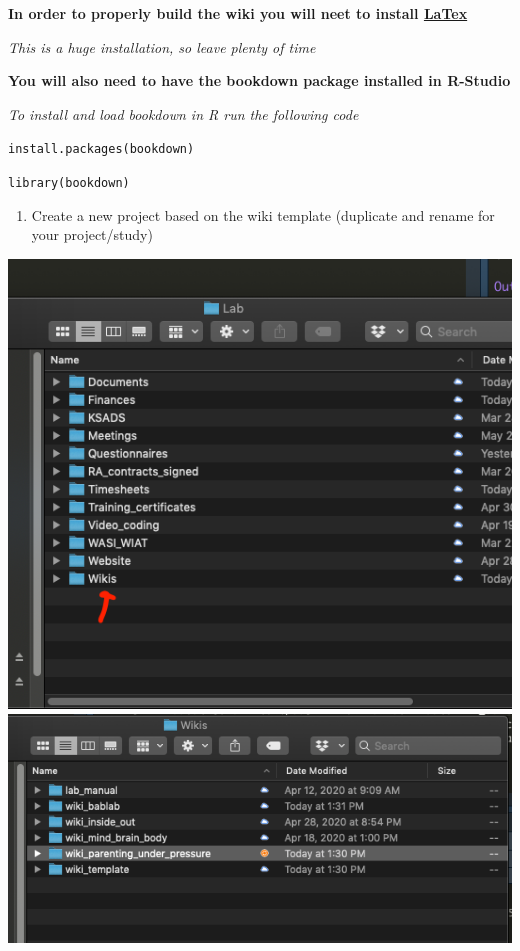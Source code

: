 \documentclass[]{book}
\providecommand{\tightlist}{%
  \setlength{\itemsep}{0pt}\setlength{\parskip}{0pt}}
\begin{document}
\textbf{In order to properly build the wiki you will neet to install
\href{https://www.latex-project.org/}{LaTex}}

\emph{This is a huge installation, so leave plenty of time}

\textbf{You will also need to have the bookdown package installed in
R-Studio}

\emph{To install and load bookdown in R run the following code}

\texttt{install.packages(\textquotesingle{}bookdown\textquotesingle{})}

\texttt{library(bookdown)}

\begin{enumerate}
\def\labelenumi{\arabic{enumi}.}
\tightlist
\item
  Create a new project based on the wiki template (duplicate and rename
  for your project/study)
\end{enumerate}

\includegraphics{images/research_protocols/wiki/1.png}
\includegraphics{images/research_protocols/wiki/2.png}
\end{document}
